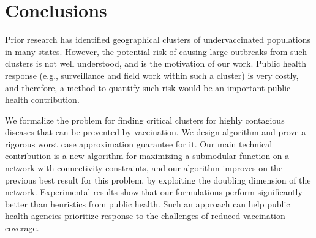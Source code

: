 \section{Conclusions}

Prior research has identified geographical clusters of undervaccinated
populations in many states. However, the potential risk of causing large outbreaks from such clusters is not well understood, and is the motivation of our work. Public health response (e.g., surveillance and field work within such a cluster) is very costly, and therefore, a method to quantify such risk would be an important public health contribution.


We formalize the problem \maxcrit{}
for finding critical clusters for highly contagious diseases that can be prevented by vaccination. 
We design algorithm \algomaxcrit{} and prove a rigorous worst case approximation guarantee for it. Our main technical contribution is a new algorithm for maximizing a submodular function on a network with connectivity constraints, and our algorithm improves on the previous best result for this problem, by exploiting the doubling dimension of the network.
Experimental results show that our formulations perform significantly better than heuristics from public health. Such an approach
can help public health agencies prioritize response to the challenges of reduced vaccination
coverage.


